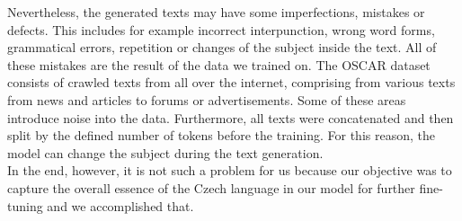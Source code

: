 Nevertheless, the generated texts may have some imperfections, mistakes or defects. This includes for example incorrect interpunction, wrong word forms, grammatical errors, repetition or changes of the subject inside the text. All of these mistakes are the result of the data we trained on. The OSCAR dataset consists of crawled texts from all over the internet, comprising from various texts from news and articles to forums or advertisements. Some of these areas introduce noise into the data. Furthermore, all texts were concatenated and then split by the defined number of tokens before the training. For this reason, the model can change the subject during the text generation.\\

In the end, however, it is not such a problem for us because our objective was to capture the overall essence of the Czech language in our model for further fine-tuning and we accomplished that.


